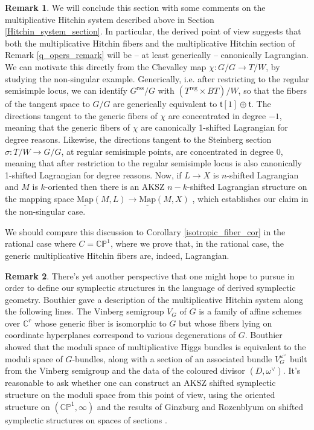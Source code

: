 \documentclass[11pt, oneside, reqno]{amsart}
\theoremstyle{definition} \newtheorem{definition}{Definition}[section]
\theoremstyle{definition} \newtheorem{remark}[definition]{Remark}
\theoremstyle{definition} \newtheorem{remarks}[definition]{Remarks}
\theoremstyle{definition} \newtheorem{question}[definition]{Question}
\theoremstyle{definition} \newtheorem*{note}{Note}
\theoremstyle{definition} \newtheorem{example}[definition]{Example}
\theoremstyle{definition} \newtheorem{examples}[definition]{Examples}
\newcommand{\bb}[1]{\mathbb{#1}}
\newcommand{\mr}[1]{\mathrm{#1}}
\newcommand{\mf}[1]{\mathfrak{#1}}
\newcommand{\ul}[1]{\underline{#1}}
\newcommand{\CC}{\mathbb{C}}
\newcommand{\map}{\ul{\mr{Map}}}
\begin{document}
\begin{remark}
We will conclude this section with some comments on the multiplicative Hitchin system described above in Section \ref{Hitchin_system_section}.  In particular, the derived point of view suggests that both the multiplicative Hitchin fibers and the multiplicative Hitchin section of Remark \ref{q_opers_remark} will be -- at least generically -- canonically Lagrangian.  We can motivate this directly from the Chevalley map $\chi \colon G/G \to T/W$, by studying the non-singular example.  Generically, i.e. after restricting to the regular semisimple locus, we can identify $G^{\mr{rss}}/G$ with $(T^{\mr{reg}} \times BT)/W$, so that the fibers of the tangent space to $G/G$ are generically equivalent to $\mf t[1] \oplus \mf t$.  The directions tangent to the generic fibers of $\chi$ are concentrated in degree $-1$, meaning that the generic fibers of $\chi$ are canonically 1-shifted Lagrangian for degree reasons.  Likewise, the directions tangent to the Steinberg section $\sigma \colon T/W \to G/G$, at regular semisimple points, are concentrated in degree 0, meaning that after restriction to the regular semisimple locus is also canonically 1-shifted Lagrangian for degree reasons.  Now, if $L \to X$ is $n$-shifted Lagrangian and $M$ is $k$-oriented then there is an AKSZ $n-k$-shifted Lagrangian structure on the mapping space $\map(M,L) \to \map(M,X)$ \cite[Theorem 2.10]{Calaque}, which establishes our claim in the non-singular case. 

We should compare this discussion to Corollary \ref{isotropic_fiber_cor} in the rational case where $C = \bb{CP}^1$, where we prove that, in the rational case, the generic multiplicative Hitchin fibers are, indeed, Lagrangian.  
\end{remark}

\begin{remark} \label{Bouthier_remark}
There's yet another perspective that one might hope to pursue in order to define our symplectic structures in the language of derived symplectic geometry.  Bouthier \cite{Bouthier2} gave a description of the multiplicative Hitchin system along the following lines.  The Vinberg semigroup $V_G$ of $G$ is a family of affine schemes over $\CC^r$ whose generic fiber is isomorphic to $G$ but whose fibers lying on coordinate hyperplanes correspond to various degenerations of $G$.  Bouthier showed that the moduli space of multiplicative Higgs bundles is equivalent to the moduli space of $G$-bundles, along with a section of an associated bundle $V_G^{\omega^\vee}$ built from the Vinberg semigroup and the data of the coloured divisor $(D,\omega^\vee)$.  It's reasonable to ask whether one can construct an AKSZ shifted symplectic structure on the moduli space from this point of view, using the oriented structure on $(\bb{CP}^1,\infty)$ and the results of Ginzburg and Rozenblyum on shifted symplectic structures on spaces of sections \cite{GinzburgRozenblyum}.  
\end{remark}
\end{document}
